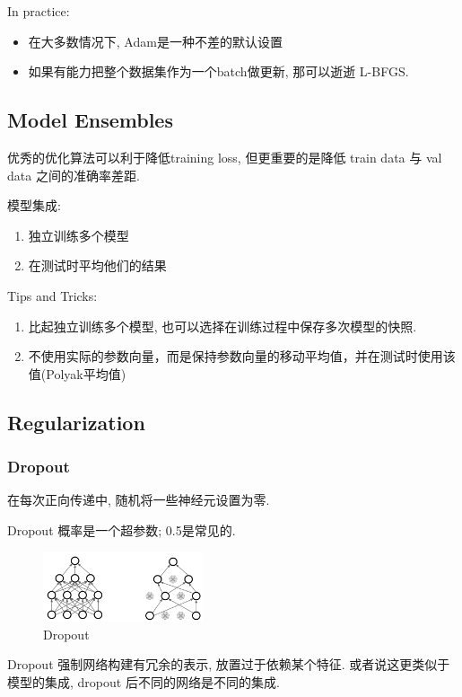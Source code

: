 In practice:
\begin{itemize}
    \item 在大多数情况下, Adam是一种不差的默认设置
    \item 如果有能力把整个数据集作为一个batch做更新, 那可以逝逝 L-BFGS. 
\end{itemize}

\subsection{Model Ensembles}
优秀的优化算法可以利于降低training loss, 但更重要的是降低 train data 与 val data 之间的准确率差距. 

模型集成:
\begin{enumerate}
    \item 独立训练多个模型
    \item 在测试时平均他们的结果
\end{enumerate}

Tips and Tricks:
\begin{enumerate}
    \item 比起独立训练多个模型, 也可以选择在训练过程中保存多次模型的快照. 
    \item 不使用实际的参数向量，而是保持参数向量的移动平均值，并在测试时使用该值(Polyak平均值)
\end{enumerate}

\subsection{Regularization}
\subsubsection{Dropout}
在每次正向传递中, 随机将一些神经元设置为零. 

Dropout 概率是一个超参数; 0.5是常见的. 

\begin{figure}[!htb]
    \centering
    \includegraphics[width=0.42\textwidth]{pic/Lec7/Dropout}
    \caption{Dropout}
\end{figure}

Dropout 强制网络构建有冗余的表示, 放置过于依赖某个特征. 或者说这更类似于模型的集成, dropout 后不同的网络是不同的集成. 

